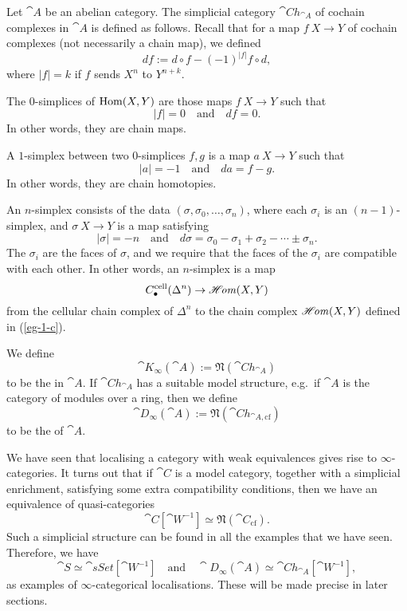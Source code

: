 \begin{example}
    Let $\cat A$ be an abelian category.
    The simplicial category $\cat{Ch}_{\cat A}$ of cochain complexes in $\cat A$
    is defined as follows.
    Recall that for a map $f\:X\to Y$ of cochain complexes (not necessarily a chain map),
    we defined 
    \[ df:=d\circ f-(-1)^{|f|}f\circ d, \]
    where $|f|=k$ if $f$ sends $X^n$ to $Y^{n+k}$.
    \begin{itms}
        \item The $0$-simplices of $\operatorname{Hom}(X,Y)$ are those maps $f\:X\to Y$
        such that 
        \[ |f|=0\quad\text{and}\quad df=0. \]
        In other words, they are chain maps.
        \item A $1$-simplex between two $0$-simplices $f,g$ is a map $a\:X\to Y$
        such that 
        \[ |a|=-1\quad\text{and}\quad da=f-g. \]
        In other words, they are chain homotopies.
        \item An $n$-simplex consists of the data $(\sigma,\sigma_0,\dotsc,\sigma_n)$,
        where each $\sigma_i$ is an $(n-1)$-simplex,
        and $\sigma\:X\to Y$ is a map satisfying
        \[ |\sigma|=-n\quad\text{and}\quad d\sigma=\sigma_0-\sigma_1+\sigma_2-\cdots\pm\sigma_n. \]
        The $\sigma_i$ are the faces of $\sigma$, and we require that
        the faces of the $\sigma_i$ are compatible with each other.
        In other words, an $n$-simplex is a map 
        \[ C_\bullet^{\textrm{cell}}(\Delta^n)\to\mathscr{H}\mkern-3mu\mathit{om}(X,Y) \]
        from the cellular chain complex of $\Delta^n$
        to the chain complex $\mathscr{H}\mkern-3mu\mathit{om}(X,Y)$ defined in (\ref{eg-1-c}).
    \end{itms}
    We define 
    \[\cat K_\infty(\cat A):=\mathfrak N(\cat{Ch}_{\cat A})\]
    to be the  in $\cat A$.
    If $\cat{Ch}_{\cat A}$ has a suitable model structure,
    e.g.\ if $\cat A$ is the category of modules over a ring, then we define 
    \[\cat D_\infty(\cat A):=\mathfrak N(\cat{Ch}_{\cat A,\mathrm{cf}})\]
    to be the  of $\cat A$. \varqed
\end{example}

\begin{remark} \label{rmk-4-locn}
    We have seen that localising a category with weak equivalences
    gives rise to $\infty$-categories.
    It turns out that if $\cat C$ is a model category,
    together with a simplicial enrichment,
    satisfying some extra compatibility conditions,
    then we have an equivalence of quasi-categories
    \[ \cat C[\cat W^{-1}]\simeq\mathfrak N(\cat C_{\mathrm{cf}}). \]
    Such a simplicial structure can be found in all the examples that we have seen.
    Therefore, we have
    \[ \cat S\simeq\cat{sSet}[\cat W^{-1}]\quad\text{and}\quad
    \cat D_\infty(\cat A)\simeq\cat{Ch}_{\cat A}[\cat W^{-1}], \]
    as examples of $\infty$-categorical localisations. 
    These will be made precise in later sections. \varqed
\end{remark}
